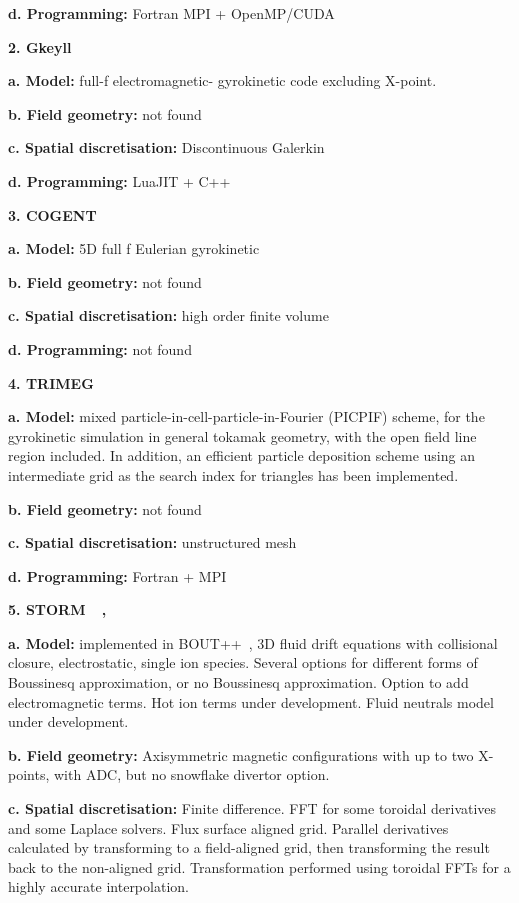\documentclass{article}
\begin{document}
\textbf{d. Programming: }Fortran MPI + OpenMP/CUDA

{ \textbf{2. Gkeyll }}{~\cite{ref [8]}}

\textbf{a. Model:} full-f electromagnetic- gyrokinetic code excluding X-point. 

\textbf{b. Field geometry: }not found

\textbf{c. Spatial discretisation: }Discontinuous Galerkin

\textbf{d. Programming: }LuaJIT + C++

{ \textbf{3. COGENT }}{~\cite{ref [9]}}

\textbf{a. Model:} 5D full f Eulerian gyrokinetic

\textbf{b. Field geometry: }not found

\textbf{c. Spatial discretisation: }high order finite volume

\textbf{d. Programming: }not found

{ \textbf{4. TRIMEG }}{~\cite{ref [10]}}

\textbf{a. Model:} mixed particle-in-cell-particle-in-Fourier (PICPIF) scheme, 
for the gyrokinetic simulation in general tokamak geometry, with the open field 
line region included. In addition, an efficient particle deposition scheme using 
an intermediate grid as the search index for triangles has been implemented.

\textbf{b. Field geometry: }not found

\textbf{c. Spatial discretisation: }unstructured mesh

\textbf{d. Programming: }Fortran + MPI

{ \textbf{5. STORM }}{~\cite{ref [11]}}{ \textbf{, 
}}{~\cite{ref [12]}}

\textbf{a. Model:} implemented in BOUT++~\cite{ref [13]}, 3D fluid drift equations with collisional 
closure, electrostatic, single ion species. Several options for different forms 
of Boussinesq approximation, or no Boussinesq approximation. Option to add electromagnetic 
terms. Hot ion terms under development. Fluid neutrals model under development.

\textbf{b. Field geometry: }Axisymmetric magnetic configurations with up to two 
X-points, { with ADC, but no snowflake divertor option.}

\textbf{c. Spatial discretisation:} Finite difference. FFT for some toroidal derivatives 
and some Laplace solvers. Flux surface aligned grid. Parallel derivatives calculated 
by transforming to a field-aligned grid, then transforming the result back to the 
non-aligned grid. Transformation performed using toroidal FFTs for a highly accurate 
interpolation.
\end{document}
